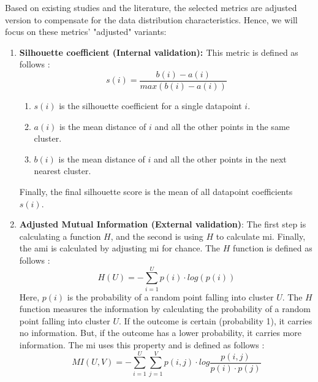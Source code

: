 Based on existing studies and the literature, the selected metrics are adjusted version to compensate for the data distribution characteristics.
Hence, we will focus on these metrics' "adjusted" variants:
\begin{enumerate}
  \item \textbf{Silhouette coefficient (Internal validation): \label{eq:silhouette_coefficient}}
        This metric is defined as follows \citep{liu_understanding_2010,rousseeuw_silhouettes_1987}:
        \begin{equation}
          s(i) = \frac{b(i) - a(i)}{max(b(i) - a(i))}
        \end{equation}
        \begin{enumerate}
          \item $s(i)$ is the silhouette coefficient for a single datapoint $i$.
          \item $a(i)$ is the mean distance of $i$ and all the other points in the same cluster.
          \item $b(i)$ is the mean distance of $i$ and all the other points in the next nearest cluster.
        \end{enumerate}
        Finally, the final silhouette score is the mean of all datapoint coefficients $s(i)$.
  \item \textbf{Adjusted Mutual Information (External validation)}:
        The first step is calculating a function $H$, and the second is using $H$ to calculate \gls{mi}.
        Finally, the \gls{ami} is calculated by adjusting \gls{mi} for chance. \newline
        The $H$ function is defined as follows \citep{vinh_information_nodate}:
        \begin{equation}
          H(U) = - \sum_{i=1}^{U} p(i) \cdot log (p(i))
        \end{equation}
        Here, $p(i)$ is the probability of a random point falling into cluster $U$.
        The $H$ function measures the information by calculating the probability of a random point falling into cluster $U$.
        If the outcome is certain (probability 1), it carries no information.
        But, if the outcome has a lower probability, it carries more information.
        The \gls{mi} uses this property and is defined as follows \citep{vinh_information_nodate}:
        \begin{equation}
          MI(U, V) = - \sum_{i=1}^{U} \sum_{j=1}^{V} p(i,j) \cdot log \frac{p(i,j)}{p(i) \cdot p(j)}

\end{equation}
\end{enumerate}
